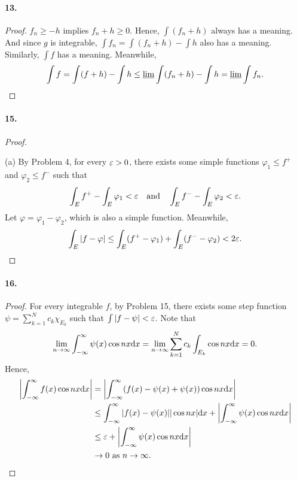   \paragraph{13.}
  \begin{proof}
    $f_n\ge -h$ implies $f_n+h\ge 0$. Hence, $\int(f_n+h)$ always has a meaning.
    And since $g$ is integrable, $\int f_n = \int(f_n+h)-\int h$ also has a
    meaning. Similarly, $\int f$ has a meaning. Meanwhile,
    \[
      \int f = \int(f+h) - \int h \le \operatorname*{\underline{lim}}\int(f_n+h) - \int h 
      = \operatorname*{\underline{lim}}\int f_n.
    \]
  \end{proof}


  \paragraph{15.}
  \begin{proof}
    $\,$\par
    (a) By Problem 4, for every $\varepsilon>0$, there exists some simple functions 
    $\varphi_1\le f^+$ and $\varphi_2\le f^-$ such that 
    \[
      \int_E f^+ - \int_E\varphi_1 < \varepsilon \quad\text{and}\quad
      \int_E f^- - \int_E\varphi_2 < \varepsilon.
    \]
    Let $\varphi=\varphi_1-\varphi_2$, which is also a simple function. 
    Meanwhile,
    \[
      \int_E|f-\varphi| \le \int_E(f^+-\varphi_1) + \int_E(f^--\varphi_2) < 2\varepsilon.
    \]
  \end{proof}
  
  \paragraph{16.}
  \begin{proof}
    For every integrable $f$, by Problem 15, there exists some step function $\psi
    =\sum_{k=1}^N c_k\chi_{E_k}$ such that $\int|f-\psi|<\varepsilon$. Note that
    \begin{equation}
      \label{eq:4.4.16}
      \lim_{n\to\infty}\int_{-\infty}^\infty \psi(x)\cos nx\mathrm{d} x =
      \lim_{n\to\infty}\sum_{k=1}^N c_k\int_{E_k}\cos nx\mathrm{d} x = 0.      
    \end{equation}
    Hence,
    \begin{align*}
      \left|\int_{-\infty}^\infty f(x)\cos nx\mathrm{d} x \right|
      &= \left|\int_{-\infty}^\infty (f(x)-\psi(x)+\psi(x))\cos nx\mathrm{d} x\right|\\
      &\le \int_{-\infty}^\infty |f(x)-\psi(x)||\cos nx|\mathrm{d} x + 
           \left|\int_{-\infty}^\infty \psi(x)\cos nx\mathrm{d} x\right| \\
      &\le \varepsilon + \left|\int_{-\infty}^\infty \psi(x)\cos nx\mathrm{d} x\right| \\
      &\to 0 \text{ as }n\to\infty.
    \end{align*}
  \end{proof}


